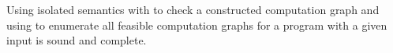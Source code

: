 \begin{theorem}
Using isolated semantics with  to check a constructed computation graph and using  to enumerate all feasible computation graphs for a program with a given input is sound and complete.
\end{theorem}

